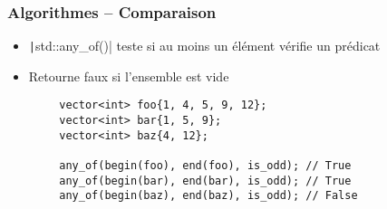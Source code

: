 \documentclass[C++.tex]{subfiles}
\begin{document}
\begin{frame}[fragile]
	\frametitle{Algorithmes -- Comparaison}
	\begin{itemize}
		\item \texttt|std::any_of()| teste si au moins un élément vérifie un prédicat
		\item Retourne faux si l'ensemble est vide
	\end{itemize}

	\begin{verbatim}
		vector<int> foo{1, 4, 5, 9, 12};
		vector<int> bar{1, 5, 9};
		vector<int> baz{4, 12};

		any_of(begin(foo), end(foo), is_odd); // True
		any_of(begin(bar), end(bar), is_odd); // True
		any_of(begin(baz), end(baz), is_odd); // False
	\end{verbatim}
\end{frame}
\end{document}
